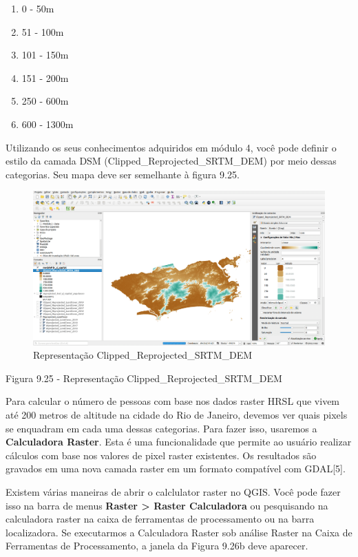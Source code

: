 \documentclass[
]{krantz}
\providecommand{\tightlist}{%
  \setlength{\itemsep}{0pt}\setlength{\parskip}{0pt}}
\begin{document}
\begin{enumerate}
\def\labelenumi{\arabic{enumi}.}
\tightlist
\item
  0 - 50m
\item
  51 - 100m
\item
  101 - 150m
\item
  151 - 200m
\item
  250 - 600m
\item
  600 - 1300m
\end{enumerate}

Utilizando os seus conhecimentos adquiridos em módulo 4, você pode definir o estilo da camada DSM (Clipped\_Reprojected\_SRTM\_DEM) por meio dessas categorias. Seu mapa deve ser semelhante à figura 9.25.

\begin{figure}
\centering
\includegraphics{media/modulo9/fig925.png}
\caption{Representação Clipped\_Reprojected\_SRTM\_DEM}
\end{figure}

Figura 9.25 - Representação Clipped\_Reprojected\_SRTM\_DEM

Para calcular o número de pessoas com base nos dados raster HRSL que vivem até 200 metros de altitude na cidade do Rio de Janeiro, devemos ver quais pixels se enquadram em cada uma dessas categorias. Para fazer isso, usaremos a \textbf{Calculadora Raster}. Esta é uma funcionalidade que permite ao usuário realizar cálculos com base nos valores de pixel raster existentes. Os resultados são gravados em uma nova camada raster em um formato compatível com GDAL{[}5{]}.

Existem várias maneiras de abrir o calclulator raster no QGIS. Você pode fazer isso na barra de menus \textbf{Raster \textgreater{} Raster Calculadora} ou pesquisando na calculadora raster na caixa de ferramentas de processamento ou na barra localizadora. Se executarmos a Calculadora Raster sob análise Raster na Caixa de Ferramentas de Processamento, a janela da Figura 9.26b deve aparecer.
\end{document}
